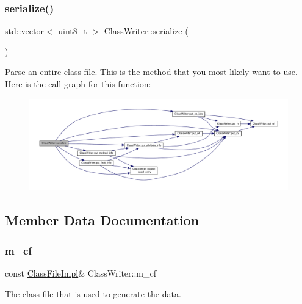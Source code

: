 \subsubsection{\texorpdfstring{serialize()}{serialize()}}
{\footnotesize\ttfamily std\+::vector$<$ uint8\+\_\+t $>$ Class\+Writer\+::serialize (\begin{DoxyParamCaption}{ }\end{DoxyParamCaption})}

Parse an entire class file. This is the method that you most likely want to use. Here is the call graph for this function\+:\nopagebreak
\begin{figure}[H]
\begin{center}
\leavevmode
\includegraphics[width=350pt]{classClassWriter_a7be4d13b5665b1e85a8a350ec181951c_cgraph}
\end{center}
\end{figure}


\subsection{Member Data Documentation}
\mbox{\label{classClassWriter_a4c495c4307d3634865d0a4d4024d4a37}} 
\subsubsection{\texorpdfstring{m\+\_\+cf}{m\_cf}}
{\footnotesize\ttfamily const \hyperlink{classClassFileImpl}{Class\+File\+Impl}\& Class\+Writer\+::m\+\_\+cf\hspace{0.3cm}{\ttfamily [private]}}



The class file that is used to generate the data. 

\mbox{\label{classClassWriter_a8a5c126a562b0329307a15386ff389f8}} 
